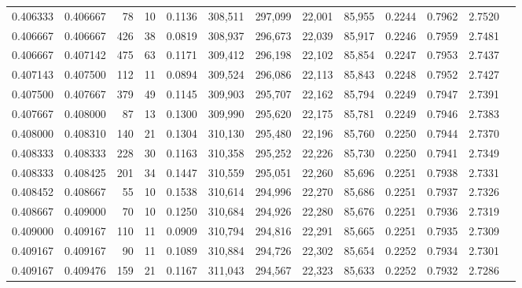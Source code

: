 \begin{tabular}{rrrrrrrrrrrrr}
0.406333 & 0.406667 &    78 &  10 &                                     0.1136 & 308,511 & 297,099 &  22,001 &  85,955 & 0.2244 & 0.7962 & 2.7520 \\
0.406667 & 0.406667 &   426 &  38 &                                     0.0819 & 308,937 & 296,673 &  22,039 &  85,917 & 0.2246 & 0.7959 & 2.7481 \\
0.406667 & 0.407142 &   475 &  63 &                                     0.1171 & 309,412 & 296,198 &  22,102 &  85,854 & 0.2247 & 0.7953 & 2.7437 \\
0.407143 & 0.407500 &   112 &  11 &                                     0.0894 & 309,524 & 296,086 &  22,113 &  85,843 & 0.2248 & 0.7952 & 2.7427 \\
0.407500 & 0.407667 &   379 &  49 &                                     0.1145 & 309,903 & 295,707 &  22,162 &  85,794 & 0.2249 & 0.7947 & 2.7391 \\
0.407667 & 0.408000 &    87 &  13 &                                     0.1300 & 309,990 & 295,620 &  22,175 &  85,781 & 0.2249 & 0.7946 & 2.7383 \\
0.408000 & 0.408310 &   140 &  21 &                                     0.1304 & 310,130 & 295,480 &  22,196 &  85,760 & 0.2250 & 0.7944 & 2.7370 \\
0.408333 & 0.408333 &   228 &  30 &                                     0.1163 & 310,358 & 295,252 &  22,226 &  85,730 & 0.2250 & 0.7941 & 2.7349 \\
0.408333 & 0.408425 &   201 &  34 &                                     0.1447 & 310,559 & 295,051 &  22,260 &  85,696 & 0.2251 & 0.7938 & 2.7331 \\
0.408452 & 0.408667 &    55 &  10 &                                     0.1538 & 310,614 & 294,996 &  22,270 &  85,686 & 0.2251 & 0.7937 & 2.7326 \\
0.408667 & 0.409000 &    70 &  10 &                                     0.1250 & 310,684 & 294,926 &  22,280 &  85,676 & 0.2251 & 0.7936 & 2.7319 \\
0.409000 & 0.409167 &   110 &  11 &                                     0.0909 & 310,794 & 294,816 &  22,291 &  85,665 & 0.2251 & 0.7935 & 2.7309 \\
0.409167 & 0.409167 &    90 &  11 &                                     0.1089 & 310,884 & 294,726 &  22,302 &  85,654 & 0.2252 & 0.7934 & 2.7301 \\
0.409167 & 0.409476 &   159 &  21 &                                     0.1167 & 311,043 & 294,567 &  22,323 &  85,633 & 0.2252 & 0.7932 & 2.7286 \\

\end{tabular}
